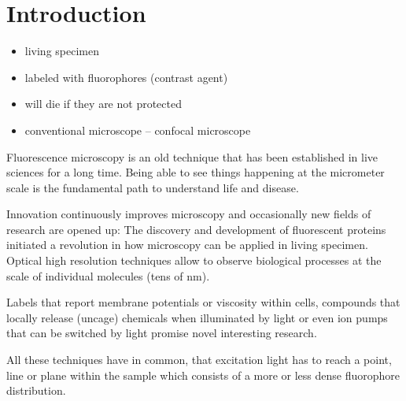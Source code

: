 \chapter{Introduction}
\begin{itemize}
\item living specimen
\item labeled with fluorophores (contrast agent)
\item will die if they are not protected
\item conventional microscope -- confocal microscope
\end{itemize}
Fluorescence microscopy is an old technique that has been established
in live sciences for a long time. Being able to see things happening
at the micrometer scale is the fundamental path to understand life and
disease.

Innovation continuously improves microscopy and occasionally new
fields of research are opened up: The discovery and development of
fluorescent proteins initiated a revolution in how microscopy can be
applied in living specimen. Optical high resolution techniques allow
to observe biological processes at the scale of individual molecules
(tens of nm). 

Labels that report membrane potentials or viscosity within cells,
compounds that locally release (uncage) chemicals when illuminated by
light or even ion pumps that can be switched by light promise novel
interesting research.

All these techniques have in common, that excitation light has to
reach a point, line or plane within the sample which consists of a
more or less dense fluorophore distribution.





